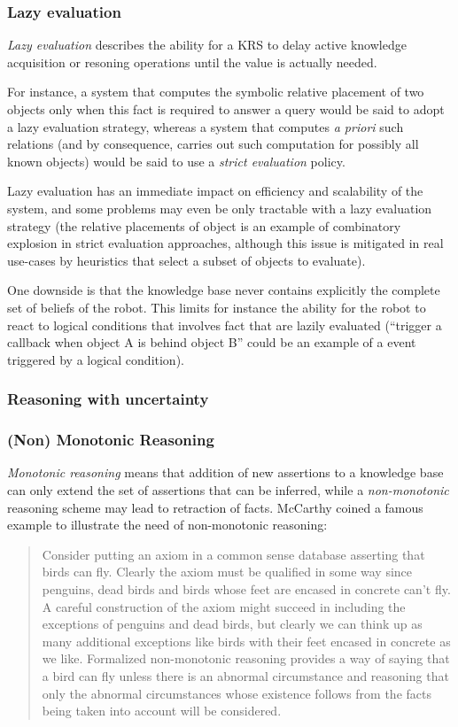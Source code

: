 \subsubsection{Lazy evaluation}
\label{sect|lazy-evaluation}

\emph{Lazy evaluation} describes the ability for a KRS to delay active
knowledge acquisition or resoning operations until the value is actually
needed.

For instance, a system that computes the symbolic relative placement of two
objects only when this fact is required to answer a query would be said to
adopt a lazy evaluation strategy, whereas a system that computes {\it a priori}
such relations (and by consequence, carries out such computation for possibly
all known objects) would be said to use a \emph{strict evaluation} policy.

Lazy evaluation has an immediate impact on efficiency and scalability of the
system, and some problems may even be only tractable with a lazy evaluation
strategy (the relative placements of object is an example of combinatory
explosion in strict evaluation approaches, although this issue is mitigated in
real use-cases by heuristics that select a subset of objects to evaluate).

One downside is that the knowledge base never contains explicitly the complete
set of beliefs of the robot. This limits for instance the ability for the robot
to react to logical conditions that involves fact that are lazily evaluated
(``trigger a callback when object A is behind object B'' could be an example of
a event triggered by a logical condition).

\subsubsection{Reasoning with uncertainty}


\subsubsection{(Non) Monotonic Reasoning}

\emph{Monotonic reasoning} means that addition of new assertions to a knowledge base
can only extend the set of assertions that can be inferred, while a
\emph{non-monotonic} reasoning scheme may lead to retraction of facts.
McCarthy coined a famous example to illustrate the need of non-monotonic reasoning:

\begin{quotation}
Consider putting an axiom in a common sense database asserting that birds can
fly. Clearly the axiom must be qualified in some way since penguins, dead birds
and birds whose feet are encased in concrete can't fly. A careful construction
of the axiom might succeed in including the exceptions of penguins and dead
birds, but clearly we can think up as many additional exceptions like birds
with their feet encased in concrete as we like. Formalized non-monotonic
reasoning provides a way of saying that a bird can fly unless there
is an abnormal circumstance and reasoning that only the abnormal circumstances
whose existence follows from the facts being taken into account will be
considered.
\end{quotation}

